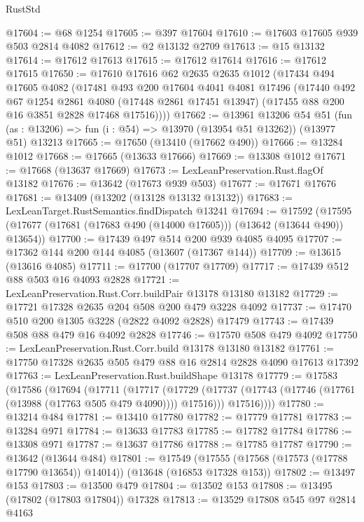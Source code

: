\begin{lexlean}{RustStd}
\begin{coremodule}
@17604 := @68 @1254
@17605 := @397 @17604
@17610 := @17603 @17605 @939 @503 @2814 @4082
@17612 := @2 @13132 @2709
@17613 := @15 @13132
@17614 := @17612 @17613
@17615 := @17612 @17614
@17616 := @17612 @17615
@17650 := @17610
    @17616
    @62
    @2635
    @2635
    @1012
    (@17434
      @494
      @17605
      @4082
      (@17481
        @493
        @200
        @17604
        @4041
        @4081
        @17496
        (@17440
          @492
          @67
          @1254
          @2861
          @4080
          (@17448 @2861 @17451 @13947)
          (@17455 @88 @200 @16 @3851 @2828 @17468 @17516))))
@17662 := @13961
    @13206
    @54
    @51
    (fun (as : @13206) => fun (i : @54) => @13970 (@13954 @51 @13262))
    (@13977 @51)
    @13213
@17665 := @17650 (@13410 (@17662 @490))
@17666 := @13284 @1012
@17668 := @17665 (@13633 @17666)
@17669 := @13308 @1012
@17671 := @17668 (@13637 @17669)
@17673 := LexLeanPreservation.Rust.flagOf @13182
@17676 := @13642 (@17673 @939 @503)
@17677 := @17671 @17676
@17681 := @13409 (@13202 (@13128 @13132 @13132))
@17683 := LexLeanTarget.RustSemantics.findDispatch @13241
@17694 := @17592
    (@17595 (@17677 (@17681 (@17683 @490 (@14000 @17605))) (@13642 (@13644 @490)) @13654))
@17700 := @17439 @497 @514 @200 @939 @4085 @4095
@17707 := @17362 @144 @200 @144 @4085 (@13607 (@17367 @144))
@17709 := @13615 (@13616 @4085)
@17711 := @17700 (@17707 @17709)
@17717 := @17439 @512 @88 @503 @16 @4093 @2828
@17721 := LexLeanPreservation.Rust.Corr.buildPair @13178 @13180 @13182
@17729 := @17721 @17328 @2635 @204 @508 @200 @479 @3228 @4092
@17737 := @17470 @510 @200 @1305 @3228 (@2822 @4092 @2828) @17479
@17743 := @17439 @508 @88 @479 @16 @4092 @2828
@17746 := @17570 @508 @479 @4092
@17750 := LexLeanPreservation.Rust.Corr.build @13178 @13180 @13182
@17761 := @17750 @17328 @2635 @505 @479 @88 @16 @2814 @2828 @4090 @17613 @17392
@17763 := LexLeanPreservation.Rust.buildShape @13178
@17779 := @17583
    (@17586
      (@17694
        (@17711
          (@17717
            (@17729 (@17737 (@17743 (@17746 (@17761 (@13988 (@17763 @505 @479 @4090)))) @17516)))
            @17516))))
@17780 := @13214 @484
@17781 := @13410 @17780
@17782 := @17779 @17781
@17783 := @13284 @971
@17784 := @13633 @17783
@17785 := @17782 @17784
@17786 := @13308 @971
@17787 := @13637 @17786
@17788 := @17785 @17787
@17790 := @13642 (@13644 @484)
@17801 := @17549
    (@17555 (@17568 (@17573 (@17788 @17790 @13654)) @14014))
    (@13648 (@16853 @17328 @153))
@17802 := @13497 @153
@17803 := @13500 @479
@17804 := @13502 @153
@17808 := @13495 (@17802 (@17803 @17804)) @17328
@17813 := @13529 @17808 @545 @97 @2814 @4163

\end{coremodule}
\end{lexlean}
